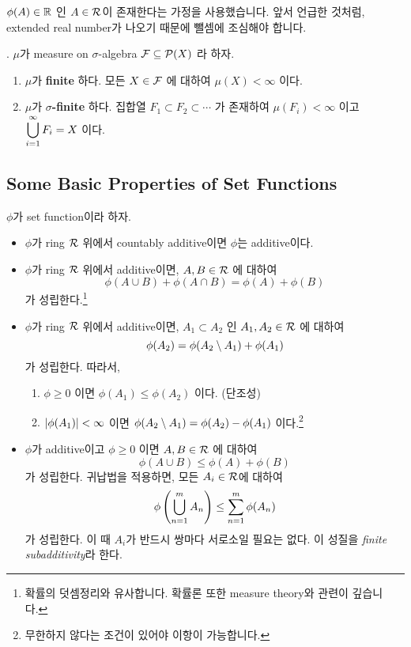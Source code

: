 \(\phi(A) \in \mathbb{R}\) 인 \(A \in \mathcal{R}\)이 존재한다는 가정을 사용했습니다. 앞서 언급한 것처럼, extended real number가 나오기 때문에 뺄셈에 조심해야 합니다.

\medskip

. \(\mu\)가 measure on \(\sigma\)-algebra \(\mathcal{F} \subseteq \mathcal{P}(X)\) 라 하자.
\begin{enumerate}
    \item \(\mu\)가 \textbf{finite} 하다. \miff 모든 \(X \in \mathcal{F}\) 에 대하여 \(\mu(X) < \infty\) 이다.
    \item \(\mu\)가 \textbf{\(\sigma\)-finite} 하다. \miff 집합열 \(F_1 \subset F_2 \subset \cdots\) 가 존재하여 \(\mu(F_i) < \infty \) 이고 \(\displaystyle \bigcup_{i=1}^\infty F_i = X\) 이다.
\end{enumerate}

\subsection*{Some Basic Properties of Set Functions}

\(\phi\)가 set function이라 하자.

\begin{itemize}
    \item \(\phi\)가 ring \(\mathcal{R}\) 위에서 countably additive이면 \(\phi\)는 additive이다.

    \item \(\phi\)가 ring \(\mathcal{R}\) 위에서 additive이면, \(A, B \in \mathcal{R}\) 에 대하여
          \[
              \phi(A\cup B) + \phi(A\cap B) = \phi(A) + \phi(B)
          \]
          가 성립한다.\footnote{확률의 덧셈정리와 유사합니다. 확률론 또한 measure theory와 관련이 깊습니다.}

    \item \(\phi\)가 ring \(\mathcal{R}\) 위에서 additive이면, \(A_1 \subset A_2\) 인 \(A_1, A_2 \in \mathcal{R}\) 에 대하여
          \[
              \phi(A_2) = \phi(A_2 \setminus A_1) + \phi(A_1)
          \]
          가 성립한다. 따라서,
          \begin{enumerate}
              \item \(\phi \geq 0\) 이면 \(\phi(A_1) \leq \phi(A_2)\) 이다. (단조성)
              \item \(\left| \phi(A_1) \right| < \infty\) 이면 \(\phi(A_2 \setminus A_1) = \phi(A_2) - \phi(A_1)\) 이다.\footnote{무한하지 않다는 조건이 있어야 이항이 가능합니다.}
          \end{enumerate}

    \item \(\phi\)가 additive이고 \(\phi \geq 0\) 이면 \(A, B \in \mathcal{R}\) 에 대하여
          \[
              \phi(A\cup B) \leq \phi(A) + \phi(B)
          \]
          가 성립한다. 귀납법을 적용하면, 모든 \(A_i \in \mathcal{R}\)에 대하여
          \[
              \phi\left( \bigcup_{n=1}^m A_n \right) \leq \sum_{n=1}^m \phi(A_n)
          \]
          가 성립한다. 이 때 \(A_i\)가 반드시 쌍마다 서로소일 필요는 없다. 이 성질을 \textit{finite subadditivity}라 한다.
\end{itemize}

